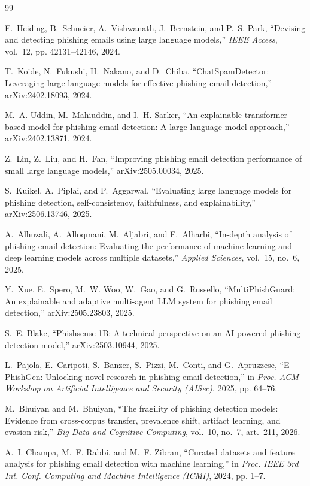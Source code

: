 \begin{thebibliography}{99}

F.~Heiding, B.~Schneier, A.~Vishwanath, J.~Bernstein, and P.~S. Park, ``Devising and detecting phishing emails using large language models,'' \emph{IEEE Access}, vol.~12, pp. 42131--42146, 2024.

T.~Koide, N.~Fukushi, H.~Nakano, and D.~Chiba, ``ChatSpamDetector: Leveraging large language models for effective phishing email detection,'' arXiv:2402.18093, 2024.

M.~A. Uddin, M.~Mahiuddin, and I.~H. Sarker, ``An explainable transformer-based model for phishing email detection: A large language model approach,'' arXiv:2402.13871, 2024.

Z.~Lin, Z.~Liu, and H.~Fan, ``Improving phishing email detection performance of small large language models,'' arXiv:2505.00034, 2025.

S.~Kuikel, A.~Piplai, and P.~Aggarwal, ``Evaluating large language models for phishing detection, self-consistency, faithfulness, and explainability,'' arXiv:2506.13746, 2025.

A.~Alhuzali, A.~Alloqmani, M.~Aljabri, and F.~Alharbi, ``In-depth analysis of phishing email detection: Evaluating the performance of machine learning and deep learning models across multiple datasets,'' \emph{Applied Sciences}, vol.~15, no.~6, 2025.

Y.~Xue, E.~Spero, M.~W. Woo, W.~Gao, and G.~Russello, ``MultiPhishGuard: An explainable and adaptive multi-agent LLM system for phishing email detection,'' arXiv:2505.23803, 2025.

S.~E. Blake, ``Phishsense-1B: A technical perspective on an AI-powered phishing detection model,'' arXiv:2503.10944, 2025.

L.~Pajola, E.~Caripoti, S.~Banzer, S.~Pizzi, M.~Conti, and G.~Apruzzese, ``E-PhishGen: Unlocking novel research in phishing email detection,'' in \emph{Proc. ACM Workshop on Artificial Intelligence and Security (AISec)}, 2025, pp. 64--76.

M.~Bhuiyan and M.~Bhuiyan, ``The fragility of phishing detection models: Evidence from cross-corpus transfer, prevalence shift, artifact learning, and evasion risk,'' \emph{Big Data and Cognitive Computing}, vol.~10, no.~7, art.~211, 2026.

A.~I. Champa, M.~F. Rabbi, and M.~F. Zibran, ``Curated datasets and feature analysis for phishing email detection with machine learning,'' in \emph{Proc. IEEE 3rd Int. Conf. Computing and Machine Intelligence (ICMI)}, 2024, pp. 1--7.


\end{thebibliography}
